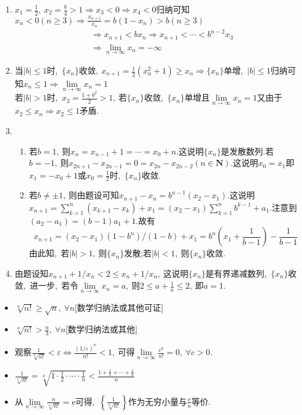 \begin{solution}
	\begin{enumerate}
		\item $x_1=\frac{1}{2},\ x_2=\frac{b}{4}>1\Rightarrow x_3<0\Rightarrow x_4<0$归纳可知$x_n<0(n\geqslant 3)\Rightarrow \frac{x_{n+1}}{x_n}=b(1-x_n)>b(n\geqslant 3)$
		$$\begin{aligned}
			&\Rightarrow x_{n+1}<bx_n\Rightarrow x_{n+1}<\cdots<b^{n-2}x_3\\
			&\Rightarrow\lim\limits_{n\rightarrow\infty}x_n=-\infty
		\end{aligned}$$
		\item 当$|b|\leqslant 1$时,\ $\{x_n\}$收敛$,\ x_{n+1}=\frac{1}{2}(x_n^2+1)\geqslant x_n\Rightarrow\{x_n\}$单增,\ $|b|\leqslant 1$归纳可知$x_n\leqslant 1\Rightarrow\lim\limits_{n\rightarrow\infty}x_n=1$\\
		若$|b|>1$时,\ $x_2=\frac{1+b^2}{2}>1,\ $若$\{x_n\}$收敛,\ $\{x_n\}$单增且$\lim\limits_{n\rightarrow\infty}x_n=1$又由于$x_2\leqslant x_n\Rightarrow x_2\leqslant 1$矛盾.
		\item \begin{enumerate}
			\item 若$b=1,\ $则$x_n=x_{n-1}+1=\cdots=x_0+n.$这说明$\{x_n\}$是发散数列.若$b=-1,\ $则$x_{2n+1}-x_{2n-1}=0=x_{2n}-x_{2n-2}(n\in\mathbf{N}).$这说明$x_0=x_1$即$x_1=-x_0+1$或$x_0=\frac{1}{2}$时,\ $\{x_n\}$收敛.
			\item 若$b\neq\pm 1,\ $则由题设可知$x_{n+1}-x_n=b^{n-1}(x_2-x_1).$这说明$x_{n+1}=\sum\limits_{k=1}^{n}(x_{k+1}-x_k)+x_1=(x_2-x_1)\sum\limits_{k=1}^{n}b^{k-1}+a_1.$注意到$(a_2-a_1)=(b-1)a_1+1.$故有
			$$x_{n+1}=(x_2-x_1)(1-b^n)/(1-b)+x_1=b^n\left(x_1+\frac{1}{b-1}\right)-\frac{1}{b-1}$$
			由此知,\ 若$|b|>1,\ $则$\{x_n\}$发散;若$|b|<1,\ $则$\{x_n\}$收敛.
		\end{enumerate}
		\item 由题设知$x_{n+1}+1/x_n<2\leqslant x_n+1/x_n,\ $这说明$\{x_n\}$是有界递减数列,\ $\{x_n\}$收敛,\ 进一步,\ 若令$\lim\limits_{n\rightarrow\infty}x_n=a,\ $则$2\leqslant a+\frac{1}{a}\leqslant 2,\ $即$a=1.$
	\end{enumerate}
\end{solution}
\begin{note}
	\begin{itemize}
		\item $\sqrt[n]{n!}\geqslant\sqrt{n},\ \forall n$[数学归纳法或其他可证]
		\item $\sqrt[n]{n!}>\frac{n}{3},\ \forall n$[数学归纳法或其他]
		\item 观察$\frac{1}{\sqrt[n]{n!}}<\varepsilon\Leftrightarrow\frac{(1/\varepsilon)^n}{n!}<1,\ $可得$\lim\limits_{n\rightarrow\infty}\frac{c^n}{n!}=0,\ \forall c>0.$
		\item $\frac{1}{\sqrt[n]{n!}}=\sqrt[n]{1\cdot\frac{1}{2}\cdot\cdots\cdot\frac{1}{n}}<\frac{1+\frac{1}{2}+\cdots+\frac{1}{n}}{n}$
		\item 从$\lim\limits_{n\rightarrow\infty}\frac{n}{\sqrt[n]{n!}}=\mathrm{e}$可得,\ $\left\{\frac{1}{\sqrt[n]{n!}}\right\}$作为无穷小量与$\frac{\mathrm{e}}{n}$等价.
	\end{itemize}
\end{note}
